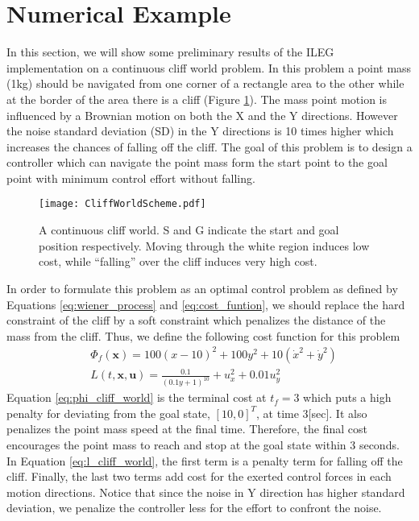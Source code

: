 \documentclass[letterpaper, 10 pt, conference]{ieeeconf}
\newcommand{\vu}{\mathbf u}
\newcommand{\vx}{\mathbf x}
\begin{document}
\section{Numerical Example}
In this section, we will show some preliminary results of the ILEG
implementation on a continuous cliff world problem. In this problem a point mass
(1kg) should be navigated from one corner of a rectangle area to the other while
at the border of the area there is a cliff (Figure \ref{fig:cliff_world}). The
mass point motion is influenced by a Brownian motion on both the X and the Y
directions. However the noise standard deviation (SD) in the Y directions is 10 times higher which increases the chances of falling off the cliff. The goal of
this problem is to design a controller which can navigate the point mass form the
start point to the goal point with minimum control effort without falling.
\begin{figure} [bpb]
\centering
\texttt{[image: CliffWorldScheme.pdf]}
\caption{A continuous cliff world. S and G indicate the start and goal
  position respectively. Moving through the white region induces low
  cost, while ``falling'' over the cliff induces very high cost.}
\label{fig:cliff_world}
\end{figure}

In order to formulate this problem as an optimal control problem as defined by 
Equations \eqref{eq:wiener_process} and \eqref{eq:cost_funtion}, we should
replace the hard constraint of the cliff by a soft constraint which penalizes the
distance of the mass from the cliff. Thus, we define the following cost function
for this problem
\begin{align}
\label{eq:phi_cliff_world} 
& \Phi_f(\vx) = 100(x-10)^2 + 100y^2 + 10(\dot{x}^2 + \dot{y}^2) \\
\label{eq:l_cliff_world} 
& L(t,\vx,\vu) = \frac{0.1}{(0.1y+1)^{10}} + u_x^2 + 0.01u_y^2
\end{align} 
Equation \eqref{eq:phi_cliff_world} is the terminal cost at $t_f=3$ which puts a
high penalty for deviating from the goal state, $[10,0]^T$, at time 3[sec]. It
also penalizes the point mass speed at the final time. Therefore, the final cost
encourages the point mass to reach and stop at the goal state within 3 seconds.
In Equation \eqref{eq:l_cliff_world}, the first term is a penalty term for
falling off the cliff. Finally, the last two terms add cost for the exerted
control forces in each motion directions. Notice that since the noise in Y
direction has higher standard deviation, we penalize the controller less for the
effort to confront the noise.
\end{document}
